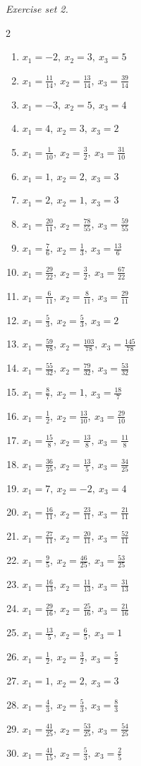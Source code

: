 \par\noindent\emph{Exercise set 2.}\nopagebreak
\begin{multicols}{2}\raggedright
\begin{enumerate}[label=\arabic*., leftmargin=*, itemsep=1pt]
\item $x_1=-2,\ x_2=3,\ x_3=5$
\item $x_1=\frac{11}{14},\ x_2=\frac{13}{14},\ x_3=\frac{39}{14}$
\item $x_1=-3,\ x_2=5,\ x_3=4$
\item $x_1=4,\ x_2=3,\ x_3=2$
\item $x_1=\frac{1}{10},\ x_2=\frac{3}{2},\ x_3=\frac{31}{10}$
\item $x_1=1,\ x_2=2,\ x_3=3$
\item $x_1=2,\ x_2=1,\ x_3=3$
\item $x_1=\frac{20}{11},\ x_2=\frac{78}{55},\ x_3=\frac{59}{55}$
\item $x_1=\frac{7}{6},\ x_2=\frac{1}{3},\ x_3=\frac{13}{6}$
\item $x_1=\frac{29}{22},\ x_2=\frac{3}{2},\ x_3=\frac{67}{22}$
\item $x_1=\frac{6}{11},\ x_2=\frac{8}{11},\ x_3=\frac{29}{11}$
\item $x_1=\frac{5}{3},\ x_2=\frac{5}{3},\ x_3=2$
\item $x_1=\frac{59}{78},\ x_2=\frac{103}{78},\ x_3=\frac{145}{78}$
\item $x_1=\frac{55}{32},\ x_2=\frac{79}{32},\ x_3=\frac{53}{32}$
\item $x_1=\frac{8}{7},\ x_2=1,\ x_3=\frac{18}{7}$
\item $x_1=\frac{1}{2},\ x_2=\frac{13}{10},\ x_3=\frac{29}{10}$
\item $x_1=\frac{15}{8},\ x_2=\frac{13}{8},\ x_3=\frac{11}{8}$
\item $x_1=\frac{36}{25},\ x_2=\frac{13}{5},\ x_3=\frac{34}{25}$
\item $x_1=7,\ x_2=-2,\ x_3=4$
\item $x_1=\frac{16}{11},\ x_2=\frac{23}{11},\ x_3=\frac{21}{11}$
\item $x_1=\frac{27}{11},\ x_2=\frac{20}{11},\ x_3=\frac{52}{11}$
\item $x_1=\frac{9}{5},\ x_2=\frac{46}{25},\ x_3=\frac{53}{25}$
\item $x_1=\frac{16}{13},\ x_2=\frac{11}{13},\ x_3=\frac{31}{13}$
\item $x_1=\frac{29}{16},\ x_2=\frac{25}{16},\ x_3=\frac{21}{16}$
\item $x_1=\frac{13}{5},\ x_2=\frac{6}{5},\ x_3=1$
\item $x_1=\frac{1}{2},\ x_2=\frac{3}{2},\ x_3=\frac{5}{2}$
\item $x_1=1,\ x_2=2,\ x_3=3$
\item $x_1=\frac{4}{3},\ x_2=\frac{5}{3},\ x_3=\frac{8}{3}$
\item $x_1=\frac{41}{25},\ x_2=\frac{53}{25},\ x_3=\frac{54}{25}$
\item $x_1=\frac{41}{15},\ x_2=\frac{5}{3},\ x_3=\frac{2}{5}$
\end{enumerate}
\end{multicols}
